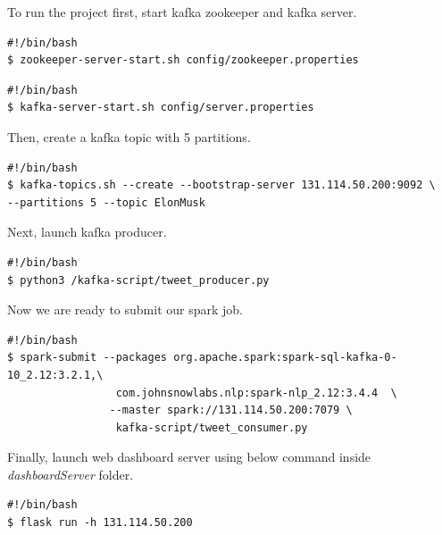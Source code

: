 \documentclass[12pt,a4paper]{report}
\begin{document}
To run the project first, start kafka zookeeper and kafka server.

\begin{verbatim}
#!/bin/bash
$ zookeeper-server-start.sh config/zookeeper.properties
\end{verbatim}

\begin{verbatim}
#!/bin/bash
$ kafka-server-start.sh config/server.properties
\end{verbatim}

Then, create a kafka topic with 5 partitions.
\begin{verbatim}
#!/bin/bash
$ kafka-topics.sh --create --bootstrap-server 131.114.50.200:9092 \
--partitions 5 --topic ElonMusk 
\end{verbatim}

Next, launch kafka producer.

\begin{verbatim}
#!/bin/bash
$ python3 /kafka-script/tweet_producer.py 
\end{verbatim}

Now we are ready to submit our spark job.

\begin{verbatim}
#!/bin/bash
$ spark-submit --packages org.apache.spark:spark-sql-kafka-0-10_2.12:3.2.1,\
                 com.johnsnowlabs.nlp:spark-nlp_2.12:3.4.4  \
                --master spark://131.114.50.200:7079 \ 
                 kafka-script/tweet_consumer.py 
\end{verbatim}

Finally, launch web dashboard server using below command inside \textit{dashboardServer} folder.

\begin{verbatim}
#!/bin/bash
$ flask run -h 131.114.50.200 
\end{verbatim}

\medskip
\printbibliography
\end{document}
